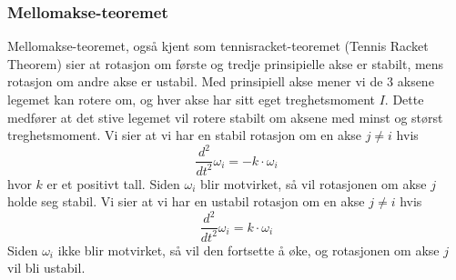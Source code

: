 \subsubsection{Mellomakse-teoremet}
\label{subseq:tennis}
Mellomakse-teoremet, også kjent som tennisracket-teoremet (Tennis Racket Theorem) \cite{DAMME:1} sier at rotasjon om første og tredje prinsipielle akse er stabilt, mens rotasjon om andre akse er ustabil. Med prinsipiell akse mener vi de $3$ aksene legemet kan rotere om, og hver akse har sitt eget treghetsmoment $I$. Dette medfører at det stive legemet vil rotere stabilt om aksene med minst og størst treghetsmoment.\newline\newline
Vi sier at vi har en stabil rotasjon om en akse $j\ne i$ hvis
\begin{equation}
\label{eqn:stabil}
    \frac{d^2}{dt^2}\omega_i=-k\cdot\omega_i
\end{equation}
hvor $k$ er et positivt tall. Siden $\omega_i$ blir motvirket, så vil rotasjonen om akse $j$ holde seg stabil.\newline\newline
Vi sier at vi har en ustabil rotasjon om en akse $j\ne i$ hvis
\begin{equation}
\label{eqn:ustabil}
    \frac{d^2}{dt^2}\omega_i=k\cdot\omega_i
\end{equation}
Siden $\omega_i$ ikke blir motvirket, så vil den fortsette å øke, og rotasjonen om akse $j$ vil bli ustabil.\newline\newline
